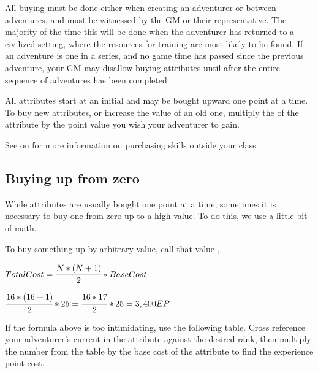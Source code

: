 \begin{multicols*}{2}
All buying must be done either when creating an adventurer or between adventures, and must be witnessed by the GM or their representative. The majority of the time this will be done when the adventurer has returned to a civilized setting, where the resources for training are most likely to be found. If an adventure is one in a series, and no game time has passed since the previous adventure, your GM may disallow buying attributes until after the entire sequence of adventures has been completed.

All attributes start at an initial  and may be bought upward one point at a time. To buy new attributes, or increase the value of an old one, multiply the  of the attribute by the point value you wish your adventurer to gain.



See  on  for more information on purchasing skills outside your class.
\subsection{Buying up from zero}
While attributes are usually bought one point at a time, sometimes it is necessary to buy one from zero up to a high value. To do this, we use a little bit of math.

To buy something up by arbitrary value, call that value ,
\begin{normboxc}
\large
$Total Cost = \cfrac{N * (N+1)}{2} * Base Cost$
\end{normboxc}

\begin{normboxc}
\large
$\cfrac{16 * (16+1)}{2} * 25 = \cfrac{16*17}{2} * 25 = 3,400 EP$
\end{normboxc}

If the formula above is too intimidating, use the following table. Cross reference your adventurer's current  in the attribute against the desired rank, then multiply the number from the table by the base cost of the attribute to find the experience point cost.
\end{multicols*}
